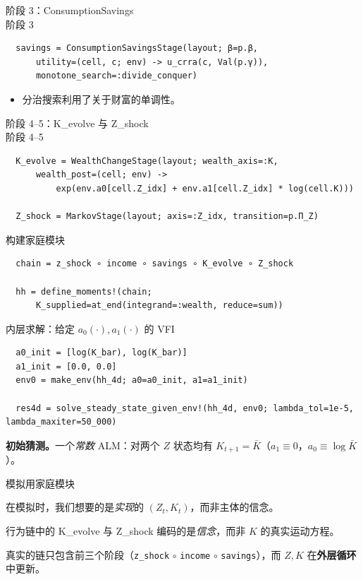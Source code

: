 \documentclass[10pt,aspectratio=169]{beamer}
\begin{document}
\begin{frame}[fragile]{阶段 3：ConsumptionSavings \\ 阶段 3}
  \begin{lstlisting}
  savings = ConsumptionSavingsStage(layout; β=p.β,
      utility=(cell, c; env) -> u_crra(c, Val(p.γ)),
      monotone_search=:divide_conquer)
  \end{lstlisting}

  \begin{itemize}
    \item 分治搜索利用了关于财富的单调性。
  \end{itemize}
\end{frame}

\begin{frame}[fragile]{阶段 4--5：K\_evolve 与 Z\_shock \\ 阶段 4--5}
  \begin{lstlisting}
  K_evolve = WealthChangeStage(layout; wealth_axis=:K,
      wealth_post=(cell; env) ->
          exp(env.a0[cell.Z_idx] + env.a1[cell.Z_idx] * log(cell.K)))

  Z_shock = MarkovStage(layout; axis=:Z_idx, transition=p.Π_Z)
  \end{lstlisting}
\end{frame}

\begin{frame}[fragile]{构建家庭模块}
  \begin{lstlisting}
  chain = z_shock ∘ income ∘ savings ∘ K_evolve ∘ Z_shock

  hh = define_moments!(chain;
      K_supplied=at_end(integrand=:wealth, reduce=sum))
  \end{lstlisting}
\end{frame}

\begin{frame}[fragile]{内层求解：给定 $a_0(\cdot), a_1(\cdot)$ 的 VFI}
  \begin{lstlisting}
  a0_init = [log(K_bar), log(K_bar)]
  a1_init = [0.0, 0.0]
  env0 = make_env(hh_4d; a0=a0_init, a1=a1_init)

  res4d = solve_steady_state_given_env!(hh_4d, env0; lambda_tol=1e-5, lambda_maxiter=50_000)
  \end{lstlisting}

  \textbf{初始猜测。}一个\emph{常数} ALM：对两个 $Z$ 状态均有 $K_{t+1} = \bar K$（$a_1 \equiv 0$，$a_0 \equiv \log \bar K$）。
\end{frame}

\begin{frame}{模拟用家庭模块}

  在模拟时，我们想要的是\emph{实现}的 $(Z_t, K_t)$，而非主体的信念。

  行为链中的 K\_evolve 与 Z\_shock 编码的是\emph{信念}，而非 $K$ 的真实运动方程。

  真实的链只包含前三个阶段（\texttt{z\_shock} $\circ$ \texttt{income} $\circ$ \texttt{savings}），而 $Z, K$ 在\textbf{外层循环}中更新。
\end{frame}
\end{document}
